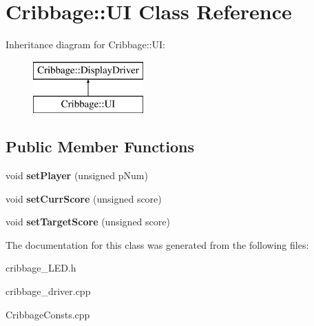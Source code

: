 \hypertarget{class_cribbage_1_1_u_i}{}\section{Cribbage\+:\+:UI Class Reference}
\label{class_cribbage_1_1_u_i}
Inheritance diagram for Cribbage\+:\+:UI\+:\begin{figure}[H]
\begin{center}
\leavevmode
\includegraphics[height=2.000000cm]{class_cribbage_1_1_u_i}
\end{center}
\end{figure}
\subsection*{Public Member Functions}
\begin{DoxyCompactItemize}
\item 
\mbox{\label{class_cribbage_1_1_u_i_ac0fb122d0204fb30566b178ab7a485d6}} 
void {\bfseries set\+Player} (unsigned p\+Num)
\item 
\mbox{\label{class_cribbage_1_1_u_i_a15c0fb4d28e668aaf36de5dd79020940}} 
void {\bfseries set\+Curr\+Score} (unsigned score)
\item 
\mbox{\label{class_cribbage_1_1_u_i_a1b91fd9dfd086dfaa448dff7f86cd3dc}} 
void {\bfseries set\+Target\+Score} (unsigned score)
\end{DoxyCompactItemize}


The documentation for this class was generated from the following files\+:\begin{DoxyCompactItemize}
\item 
cribbage\+\_\+\+L\+E\+D.\+h\item 
cribbage\+\_\+driver.\+cpp\item 
Cribbage\+Consts.\+cpp\end{DoxyCompactItemize}
